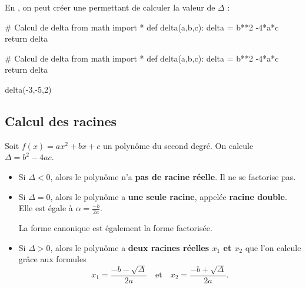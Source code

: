 \documentclass[a4paper,11pt]{article}
\begin{document}
\begin{calgo}
En \calgpython, on peut créer une  permettant de calculer la valeur de $\Delta$ :

\begin{tcpythoncode}[15cm]
	\begin{pyverbatim}[][fontsize=\footnotesize,numbers=left,numbersep=10pt]
		# Calcul de delta
		from math import *
		def delta(a,b,c):
			delta = b**2 -4*a*c
			return delta
	\end{pyverbatim}
\end{tcpythoncode}

\begin{pyconcode}
# Calcul de delta
from math import *
def delta(a,b,c):
	delta = b**2 -4*a*c
	return delta
	

\end{pyconcode}

\begin{consolepython}[15cm]
\begin{pyconsole}[][framesep=3mm,frame=single,label={[\scriptsize Début de la console \logopython]\scriptsize Fin de la console \logopython},fontsize=\footnotesize,framerule=1pt,rulecolor=\color{ForestGreen}]
delta(-3,-5,2)
\end{pyconsole}
\end{consolepython}
\smallskip
\end{calgo}

\subsection{Calcul des racines}

\begin{cthm}
Soit $f(x)=ax^2+bx+c$ un polynôme du second degré. On calcule $\Delta=b^2-4ac$.
\begin{itemize}
	\item Si $\Delta <0$, alors le polynôme n'a \textbf{pas de racine réelle}. Il ne se factorise pas.
	\item Si $\Delta=0$, alors le polynôme a \textbf{une seule racine}, appelée \textbf{racine double}. Elle est égale à $\alpha=\frac{-b}{2a}$.
	
	La forme canonique est également la forme factorisée.
	\item Si $\Delta>0$, alors le polynôme a \textbf{deux racines réelles $x_1$ et $x_2$} que l'on calcule grâce aux formules \[x_1=\frac{-b-\sqrt{\Delta}}{2a} \quad \mbox{et} \quad x_2=\frac{-b+\sqrt{\Delta}}{2a}.\]
\end{itemize}
\end{cthm}
\end{document}
